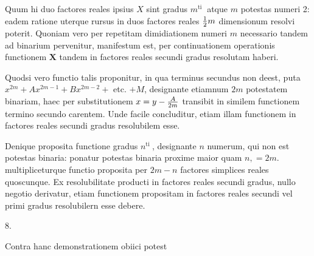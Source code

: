 \documentclass[twoside,12pt, showframe]{memoir}
\let\oldfrac\frac
\def\frac#1#2{\mathchoice{\tfrac{#1}{#2}}{\oldfrac{#1}{#2}}{\genfrac{}{}{}{2}{#1}{#2\mathstrut}}{\genfrac{}{}{}{3}{#1}{#2\mathstrut}}}
\begin{document}
Quum hi duo factores reales ipsius \(X\) sint gradus \(m^{\text {ti }}\) atque \(m\) potestas numeri 2: eadem ratione uterque rursus in duos factores reales \(\frac{1}{2} m\) dimensionum resolvi poterit. Quoniam vero per repetitam dimidiationem numeri \(m\) necessario tandem ad binarium pervenitur, manifestum est, per continuationem operationis functionem \(\boldsymbol{X}\) tandem in factores reales secundi gradus resolutam haberi.

Quodsi vero functio talis proponitur, in qua terminus secundus non deest, puta \(x^{2 m}+A x^{2 m-1}+B x^{2 m-2}+\) etc. \(+M\), designante etiamnum \(2 m\) potestatem binariam, haec per substitutionem \(x=y-\frac{A}{2 m}\) transibit in similem functionem termino secundo carentem. Unde facile concluditur, etiam illam functionem in factores reales secundi gradus resolubilem esse.

Denique proposita functione gradus \(n^{\text {ti }}\), designante \(n\) numerum, qui non
est potestas binaria: ponatur potestas binaria proxime maior quam \(n,=2 m\). multipliceturque functio proposita per \(2 m-n\) factores simplices reales quoscunque. Ex resolubilitate producti in factores reales secundi gradus, nullo negotio derivatur, etiam functionem propositam in factores reales secundi vel primi gradus resolubilern esse debere.

8.

Contra hanc demonstrationem obiici potest
\end{document}
